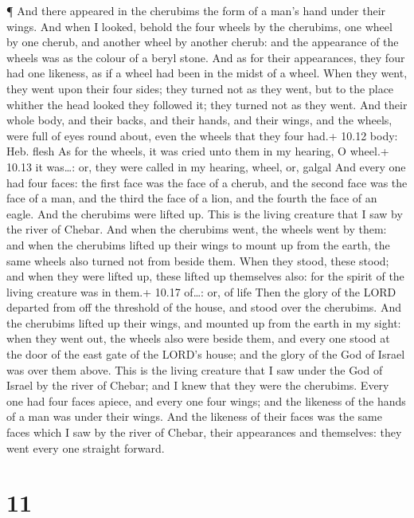  ¶ And there appeared in the cherubims the form of a man's
hand under their wings.  And when I looked, behold the four
wheels by the cherubims, one wheel by one cherub, and another wheel by
another cherub: and the appearance of the wheels was as the colour of a
beryl stone.  And as for their appearances, they four had
one likeness, as if a wheel had been in the midst of a wheel.
 When they went, they went upon their four sides; they
turned not as they went, but to the place whither the head looked they
followed it; they turned not as they went.  And their whole
body, and their backs, and their hands, and their wings, and the wheels,
were full of eyes round about, even the wheels that they four had.+
10.12 body: Heb. flesh  As for the wheels, it was cried
unto them in my hearing, O wheel.+ 10.13 it was\ldots: or, they were
called in my hearing, wheel, or, galgal  And every one had
four faces: the first face was the face of a cherub, and the second face
was the face of a man, and the third the face of a lion, and the fourth
the face of an eagle.  And the cherubims were lifted up.
This is the living creature that I saw by the river of Chebar.
 And when the cherubims went, the wheels went by them: and
when the cherubims lifted up their wings to mount up from the earth, the
same wheels also turned not from beside them.  When they
stood, these stood; and when they were lifted up, these lifted up
themselves also: for the spirit of the living creature was in them.+
10.17 of\ldots: or, of life  Then the glory of the LORD
departed from off the threshold of the house, and stood over the
cherubims.  And the cherubims lifted up their wings, and
mounted up from the earth in my sight: when they went out, the wheels
also were beside them, and every one stood at the door of the east gate
of the LORD's house; and the glory of the God of Israel was over them
above.  This is the living creature that I saw under the
God of Israel by the river of Chebar; and I knew that they were the
cherubims.  Every one had four faces apiece, and every one
four wings; and the likeness of the hands of a man was under their
wings.  And the likeness of their faces was the same faces
which I saw by the river of Chebar, their appearances and themselves:
they went every one straight forward.

\hypertarget{section-10}{%
\section{11}\label{section-10}}

